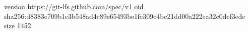 version https://git-lfs.github.com/spec/v1
oid sha256:d8383e709b1c3b548ad4c89e65493be1fc309c4bc21dd00a222ea32c0dcf3edc
size 1452
